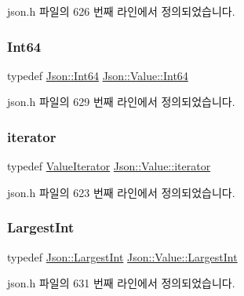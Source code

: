 json.\+h 파일의 626 번째 라인에서 정의되었습니다.

\mbox{\label{class_json_1_1_value_a1b86af9f85f0f1baa972c3319fa22695}} 
\subsubsection{\texorpdfstring{Int64}{Int64}}
{\footnotesize\ttfamily typedef \hyperlink{namespace_json_ac62566f36fd33115957b91305c9ed1dc}{Json\+::\+Int64} \hyperlink{class_json_1_1_value_a1b86af9f85f0f1baa972c3319fa22695}{Json\+::\+Value\+::\+Int64}}



json.\+h 파일의 629 번째 라인에서 정의되었습니다.

\mbox{\label{class_json_1_1_value_a341cdf2e01f8b3c5b7317aa2f0768c53}} 
\subsubsection{\texorpdfstring{iterator}{iterator}}
{\footnotesize\ttfamily typedef \hyperlink{class_json_1_1_value_iterator}{Value\+Iterator} \hyperlink{class_json_1_1_value_a341cdf2e01f8b3c5b7317aa2f0768c53}{Json\+::\+Value\+::iterator}}



json.\+h 파일의 623 번째 라인에서 정의되었습니다.

\mbox{\label{class_json_1_1_value_a1cbb82642ed05109b9833e49f042ece7}} 
\subsubsection{\texorpdfstring{Largest\+Int}{LargestInt}}
{\footnotesize\ttfamily typedef \hyperlink{namespace_json_a218d880af853ce786cd985e82571d297}{Json\+::\+Largest\+Int} \hyperlink{class_json_1_1_value_a1cbb82642ed05109b9833e49f042ece7}{Json\+::\+Value\+::\+Largest\+Int}}



json.\+h 파일의 631 번째 라인에서 정의되었습니다.

